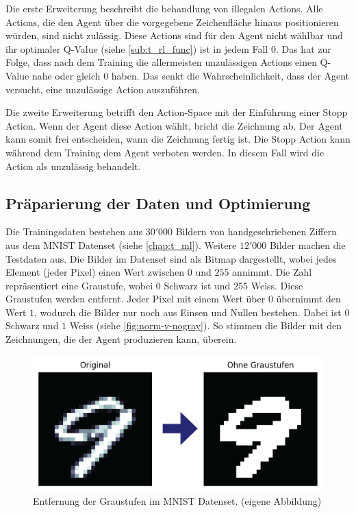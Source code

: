Die erste Erweiterung beschreibt die behandlung von illegalen Actions. Alle
Actions, die den Agent über die vorgegebene Zeichenfläche hinaus positionieren
würden, sind nicht zulässig. Diese Actions sind für den Agent nicht wählbar
und ihr optimaler Q-Value (siehe \ref{sub:t_rl_func}) ist in jedem Fall
$0$. Das hat zur Folge, dass nach dem Training die allermeisten unzulässigen
Actions einen Q-Value nahe oder gleich $0$ haben. Das senkt die
Wahrscheinlichkeit, dass der Agent versucht, eine unzulässige Action
auszuführen.

Die zweite Erweiterung betrifft den Action-Space mit der Einführung einer Stopp
Action. Wenn der Agent diese Action wählt, bricht die Zeichnung ab. Der Agent
kann somit frei entscheiden, wann die Zeichnung fertig ist. Die Stopp Action
kann während dem Training dem Agent verboten werden. In diesem Fall wird die
Action als unzulässig behandelt.



\subsection{Präparierung der Daten und Optimierung}\label{sub:m_grund_data} Die
Trainingsdaten bestehen aus $30'000$ Bildern von handgeschriebenen Ziffern aus
dem MNIST Datenset (siehe \ref{chap:t_ml}). Weitere $12'000$ Bilder machen
die Testdaten aus. Die Bilder im Datenset sind als Bitmap dargestellt, wobei
jedes Element (jeder Pixel) einen Wert zwischen $0$ und $255$ annimmt. Die Zahl
repräsentiert eine Graustufe, wobei $0$ Schwarz ist und $255$ Weiss. Diese
Graustufen werden entfernt. Jeder Pixel mit einem Wert über $0$ übernimmt den
Wert $1$, wodurch die Bilder nur noch aus Einsen und Nullen bestehen. Dabei ist
$0$ Schwarz und $1$ Weiss (siehe \autoref{fig:norm-v-nogray}). So stimmen die
Bilder mit den Zeichnungen, die der Agent produzieren kann, überein.
 
\begin{figure}[!ht]
 \centering
 \includegraphics[width=\textwidth]{images/methode/norm-v-nogray.png}
 \caption{Entfernung der Graustufen im MNIST Datenset. (eigene Abbildung)}\label{fig:norm-v-nogray}
\end{figure}

